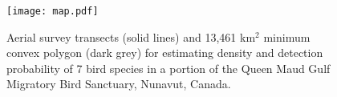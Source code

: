 \documentclass[aoas,preprint]{imsart}
\numberwithin{equation}{section}
\theoremstyle{plain}
\begin{document}

\begin{figure}
\begin{center}
\texttt{[image: map.pdf]}
\caption{Aerial survey transects (solid lines) and 13,461 km$^2$ minimum convex polygon (dark grey) for estimating density and detection probability of 7 bird species in a portion of the Queen Maud Gulf Migratory Bird Sanctuary, Nunavut, Canada.}
\label{fig:map}
\end{center}
\end{figure}
\end{document}
